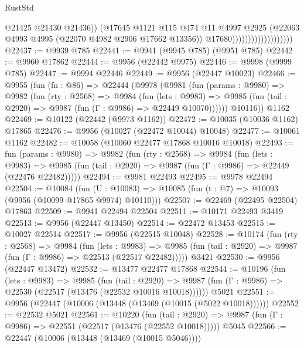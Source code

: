 \begin{lexlean}{RustStd}
\begin{coremodule}
                                            @21425
                                            @21430
                                            @21436))
                                        (@17645
                                          @1121
                                          @115
                                          @474
                                          @11
                                          @4997
                                          @2925
                                          (@22063 @4993 @4995 (@22070 @4982 @2906 @17662 @13356))
                                          @17680)))))))))))))))))))
@22437 := @9939 @785
@22441 := @9941 (@9945 @785) (@9951 @785)
@22442 := @9960 @17862
@22444 := @9956 (@22442 @9975)
@22446 := @9998 (@9999 @785)
@22447 := @9994 @22446
@22449 := @9956 (@22447 @10023)
@22466 := @9955
    (fun (fn : @86) =>
    @22444
      (@9978
        (@9981
          (fun (params : @9980) =>
          @9982
            (fun (rty : @2568) =>
            @9984
              (fun (lets : @9983) =>
              @9985 (fun (tail : @2920) => @9987 (fun (Γ : @9986) => @22449 @10070))))))
        @10116))
    @1162
@22469 := @10122 (@22442 (@9973 @1162))
@22472 := @10035 (@10036 @1162) @17865
@22476 := @9956 (@10027 (@22472 @10044) @10048)
@22477 := @10061 @1162
@22482 := @10058 (@10060 @22477 @17868 @10016 @10018)
@22493 := fun (params : @9980) =>
  @9982
    (fun (rty : @2568) =>
    @9984
      (fun (lets : @9983) =>
      @9985 (fun (tail : @2920) => @9987 (fun (Γ : @9986) => @22449 (@22476 @22482)))))
@22494 := @9981 @22493
@22495 := @9978 @22494
@22504 := @10084
    (fun (U : @10083) => @10085 (fun (t : @7) => @10093 (@9956 (@10099 @17865 @9974) @10110)))
@22507 := @22469 (@22495 @22504) @17863
@22509 := @9941 @22494 @22504
@22511 := @10171 @22493 @3419
@22513 := @9956 (@22447 @13450)
@22514 := @22472 @13453
@22515 := @10027 @22514
@22517 := @9956 (@22515 @10048)
@22528 := @10174
    (fun (rty : @2568) =>
    @9984
      (fun (lets : @9983) =>
      @9985 (fun (tail : @2920) => @9987 (fun (Γ : @9986) => @22513 (@22517 @22482)))))
    @3421
@22530 := @9956 (@22447 @13472)
@22532 := @13477 @22477 @17868
@22544 := @10196
    (fun (lets : @9983) =>
    @9985
      (fun (tail : @2920) =>
      @9987 (fun (Γ : @9986) => @22530 (@22517 (@13476 (@22532 @10016 @10018))))))
    @5021
@22551 := @9956 (@22447 (@10006 (@13448 (@13469 (@10015 (@5022 @10018))))))
@22552 := @22532 @5021
@22561 := @10220
    (fun (tail : @2920) => @9987 (fun (Γ : @9986) => @22551 (@22517 (@13476 (@22552 @10018)))))
    @5045
@22566 := @22447 (@10006 (@13448 (@13469 (@10015 @5046))))

\end{coremodule}
\end{lexlean}
